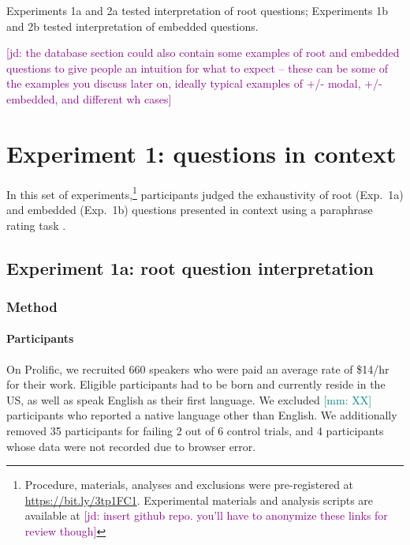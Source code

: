\documentclass[12pt,letterpaper,table,svgnames,dvipsnames]{article}
\newcommand{\jd}[1]{\textcolor{Purple}{[jd: #1]}}
\newcommand{\mm}[1]{\textcolor{teal}{[mm: #1]}}
\begin{document}
Experiments 1a and 2a tested interpretation of root questions; Experiments 1b and 2b tested interpretation of embedded questions.


\jd{the database section could also contain some examples of root and embedded questions to give people an intuition for what to expect -- these can be some of the examples you discuss later on, ideally typical examples of +/- modal, +/- embedded, and different wh cases}
\section{Experiment 1: questions in context}

In this set of experiments,\footnote{Procedure, materials, analyses and exclusions were pre-registered at \url{https://bit.ly/3tp1FC1}. Experimental materials and analysis scripts are available at \jd{insert github repo. you'll have to anonymize these links for review though}}  participants judged the exhaustivity of root (Exp.~1a) and embedded (Exp.~1b) questions presented in context using a paraphrase rating task \cite{degen2015}.


\subsection{Experiment 1a: root question interpretation}

\subsubsection{Method}

\paragraph{Participants}

On Prolific, we recruited 660 speakers who were paid an average rate of \$14/hr for their work. Eligible participants had to be born and currently reside in the US, as well as speak English as their first language. We excluded \mm{XX} participants who reported a native language other than English. We additionally removed 35 participants for failing 2 out of 6 control trials, and 4 participants whose data were not recorded due to browser error.
\end{document}
